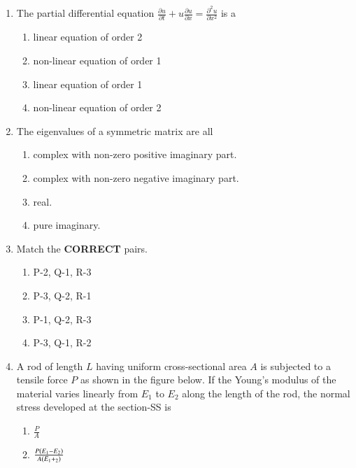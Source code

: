 \documentclass[journal]{IEEEtran}
\begin{document}
\begin{enumerate}
\item The partial differential equation $\frac{\partial u}{\partial t} + u\frac{\partial u}{\partial x} = \frac{\partial^2 u}{\partial x^2}$ is a
    \begin{enumerate}
      \item linear equation of order 2 
      \item non-linear equation of order 1
      \item linear equation of order 1
      \item non-linear equation of order 2  \\
    \end{enumerate}
\item The eigenvalues of a symmetric matrix are all  
\begin{enumerate}
    \item complex with non-zero positive imaginary part. 
    \item complex with non-zero negative imaginary part.
    \item real. 
    \item pure imaginary. \\
\end{enumerate}
\item Match the \textbf{CORRECT} pairs.
\begin{table}[h!]
  \centering
  
\end{table}
\begin{enumerate}
    \item P-2, Q-1, R-3 
    \item P-3, Q-2, R-1
    \item P-1, Q-2, R-3 
    \item P-3, Q-1, R-2  \\
\end{enumerate}
\item A rod of length $L$ having uniform cross-sectional area $A$ is subjected to a tensile force $P$ as shown in the figure below. If the Young's modulus of the material varies linearly from $E_1$ to $E_2$ along the length of the rod, the normal stress developed at the section-SS is 
\pagebreak
\begin{figure}[!ht]
\centering
\resizebox{0.5\textwidth}{!}{%

}%
\end{figure}
 \begin{enumerate}
     \item $\frac{P}{A}$
     \item $\frac{P\left(E_1-E_2\right)}{A\left(E_1+_2\right)}$

\end{enumerate}
\end{enumerate}
\end{document}
